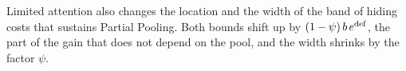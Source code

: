 Limited attention also changes the location and the width of the band of hiding costs that sustains Partial Pooling. Both bounds shift up by $(1-\psi)\,b\,e^{\rm def}$, the part of the gain that does not depend on the pool, and the width shrinks by the factor $\psi$.
